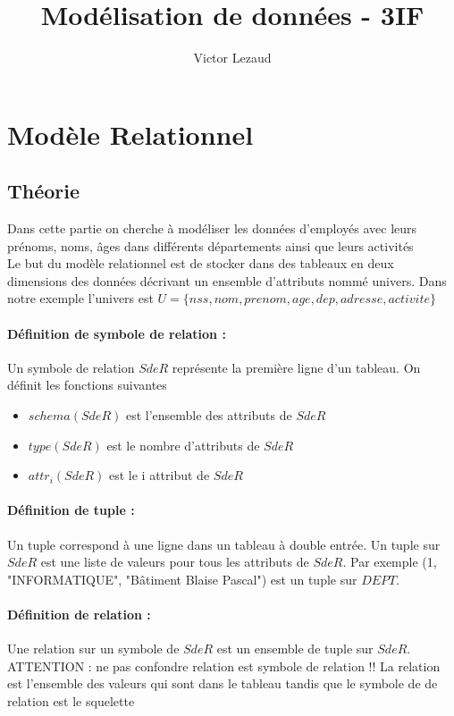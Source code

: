\documentclass[10pt,a4paper]{article}
\author{Victor Lezaud}
\title{Modélisation de données - 3IF}
\begin{document}
\maketitle
\renewcommand{\contentsname}{Sommaire}
\tableofcontents

\newpage

\section{Modèle Relationnel}
\subsection{Théorie}
Dans cette partie on cherche à modéliser les données d'employés avec leurs prénoms, noms, âges dans différents départements ainsi que leurs activités\\

Le but du modèle relationnel est de stocker dans des tableaux en deux dimensions des données décrivant un ensemble d'attributs nommé univers. Dans notre exemple l'univers est $U=\{nss, nom, prenom, age, dep, adresse, activite\}$\\

\paragraph{Définition de symbole de relation :} Un symbole de relation $SdeR$ représente la première ligne d'un tableau. On définit les fonctions suivantes

\begin{itemize}
\item $schema(SdeR)$ est l'ensemble des attributs de $SdeR$
\item $type(SdeR)$ est le nombre d'attributs de $SdeR$
\item $attr_{i}(SdeR)$ est le i attribut de $SdeR$
\end{itemize}

\paragraph*{Définition de tuple :} Un tuple correspond à une ligne dans un tableau à double entrée. Un tuple sur $SdeR$ est une liste de valeurs pour tous les attributs de $SdeR$. Par exemple (1, "INFORMATIQUE", "Bâtiment Blaise Pascal") est un tuple sur $DEPT$.\\

\paragraph*{Définition de relation :} Une relation sur un symbole de $SdeR$ est un ensemble de tuple sur $SdeR$. ATTENTION : ne pas confondre relation est symbole de relation !! La relation est l'ensemble des valeurs qui sont dans le tableau tandis que le symbole de de relation est le squelette\\
\end{document}
